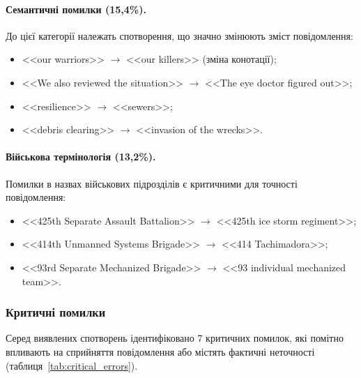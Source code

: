 \paragraph{Семантичні помилки (15,4\%).}
До цієї категорії належать спотворення, що значно змінюють зміст повідомлення:
\begin{itemize}[nosep]
    \item <<our warriors>> $\rightarrow$ <<our killers>> (зміна конотації);
    \item <<We also reviewed the situation>> $\rightarrow$ <<The eye doctor figured out>>;
    \item <<resilience>> $\rightarrow$ <<sewers>>;
    \item <<debris clearing>> $\rightarrow$ <<invasion of the wrecks>>.
\end{itemize}

\paragraph{Військова термінологія (13,2\%).}
Помилки в назвах військових підрозділів є критичними для точності повідомлення:
\begin{itemize}[nosep]
    \item <<425th Separate Assault Battalion>> $\rightarrow$ <<425th ice storm regiment>>;
    \item <<414th Unmanned Systems Brigade>> $\rightarrow$ <<414 Tachimadora>>;
    \item <<93rd Separate Mechanized Brigade>> $\rightarrow$ <<93 individual mechanized team>>.
\end{itemize}

\subsubsection{Критичні помилки}

Серед виявлених спотворень ідентифіковано 7 критичних помилок, які помітно
впливають на сприйняття повідомлення або містять фактичні неточності
(таблиця~\ref{tab:critical_errors}).

